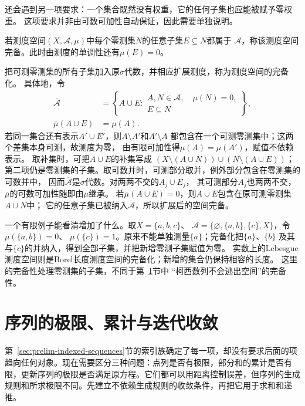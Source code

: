 还会遇到另一项要求：一个集合既然没有权重，它的任何子集也应能被赋予零权重。
这项要求并非由可数可加性自动保证，因此需要单独说明。
\begin{definition}[完备测度空间]
\label{def:analysis-complete-measure-space}
若测度空间$(X,\mathcal{A},\mu)$中每个零测集$N$的任意子集$E\subseteq N$都属于
$\mathcal{A}$，称该测度空间完备。此时由测度的单调性还有$\mu(E)=0$。
\end{definition}
把可测零测集的所有子集加入原$\sigma$代数，并相应扩展测度，称为测度空间的完备化。
具体地，令
\[
 \begin{aligned}
 \overline{\mathcal A}
 &=\left\{A\cup E:
     \begin{array}{l}
       A,N\in\mathcal A,\quad \mu(N)=0,\\
       E\subseteq N
     \end{array}\right\},\\
 \bar\mu(A\cup E)&=\mu(A).
 \end{aligned}
\]
若同一集合还有表示$A'\cup E'$，则$A\setminus A'$和$A'\setminus A$
都包含在一个可测零测集中；这两个差集本身可测，故测度为零，
由有限可加性得$\mu(A)=\mu(A')$，赋值不依赖表示。
取补集时，可把$A\cup E$的补集写成
$(X\setminus(A\cup N))\cup(N\setminus(A\cup E))$；
第二项仍是零测集的子集。取可数并时，可测部分取并，例外部分包含在零测集的可数并中，
因而$\overline{\mathcal A}$是$\sigma$代数。对两两不交的$A_j\cup E_j$，
其可测部分$A_j$也两两不交，$\bar\mu$的可数可加性随即由$\mu$继承。
若$\bar\mu(A\cup E)=0$，则$A\cup E$包含在原可测零测集$A\cup N$中；
它的任意子集已被纳入$\overline{\mathcal A}$，所以扩展后的空间完备。

一个有限例子能看清增加了什么。取$X=\{a,b,c\}$、
$\mathcal A=\{\varnothing,\{a,b\},\{c\},X\}$，令$\mu(\{a,b\})=0$、
$\mu(\{c\})=1$。原来不能单独测量$\{a\}$；完备化把$\{a\}$、$\{b\}$
及其与$\{c\}$的并纳入，得到全部子集，并把新增零测子集赋值为零。
实数上的Lebesgue测度空间则是Borel长度测度空间的完备化；新增的集合仍保持相容的长度。
这里的完备性处理零测集的子集，不同于第~\ref{sec:analysis-sequences-series-errors}节中
“柯西数列不会逃出空间”的完备性。

\section{序列的极限、累计与迭代收敛}
\label{sec:analysis-sequences-series-errors}

第~\ref{sec:prelim-indexed-sequences}节的索引族确定了每一项，却没有要求后面的项趋向任何对象。现在需要区分三种问题：点列是否有极限，部分和的累计是否有限，更新序列的极限是否满足原方程。它们都可以用距离控制误差，但序列的生成规则和所求极限不同。先建立不依赖生成规则的收敛条件，再把它用于求和和递推。

